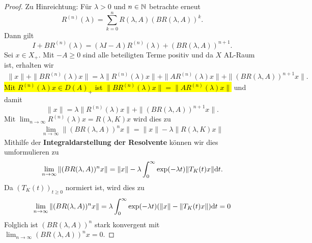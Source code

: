 \begin{proof}

\par 
Zu Hinreichtung: Für $\lambda >0$ und $n\in \mathbb{N}$ betrachte erneut
\begin{equation*}
R^{(n)}(\lambda) = \sum_{k=0}^n R(\lambda, A)(BR(\lambda, A))^k.
\end{equation*}
Dann gilt 
\begin{equation*}\label{eq2}
 I +BR^{(n)}(\lambda)=(\lambda I -A)R^{(n)}(\lambda) + (BR(\lambda, A))^{n+1}.
\end{equation*} 
Sei $x\in X_+$. Mit $-A\geq0$ sind alle beteiligten Terme positiv und da $X$ AL-Raum ist, erhalten wir
\begin{align*}
\|x\| + \|BR^{(n)}(\lambda)x\|= \lambda\| R^{(n)}(\lambda) x\| + \|AR^{(n)} (\lambda) x\|+\|(BR(\lambda, A))^{n+1}x\|.
\end{align*}
\hl{Mit $R^{(n)}(\lambda)x\in D(A)_+$ ist $\|BR^{(n)}(\lambda)x\|=\|AR^{(n)}(\lambda) x\|$} und damit
\begin{equation*}
\|x\|=\lambda \|R^{(n)}(\lambda)x\| + \|(BR(\lambda, A))^{n+1}x\|.
\end{equation*}
Mit $\lim_{n\to\infty}R^{(n)}(\lambda)x= R(\lambda, K)x$ wird dies zu
\begin{align*}
\lim_{n\to\infty}\|(BR(\lambda, A))^n x\|=\|x\|- \lambda\|R(\lambda, K)x\|
\end{align*}
Mithilfe der  \index{}\textbf{Integraldarstellung der Resolvente} können wir dies umformulieren zu
\begin{align*}
\lim_{n\to\infty}\|(BR(\lambda, A))^n x\| = \|x\|- \lambda\int_0^\infty \exp(-\lambda t)\|T_K(t)x\|\textnormal dt.
\end{align*}
Da $(T_K(t))_{t\geq0}$ normiert ist, wird dies zu
\begin{equation*}
\lim_{n\to\infty}\|(BR(\lambda, A))^n x\| =\lambda \int_0^\infty \exp(-\lambda t)(\|x\|-\|T_K(t)x\|)\textnormal dt=0
\end{equation*}
Folglich ist  $(BR(\lambda, A))^n$ stark konvergent mit $\lim_{n\to\infty}(BR(\lambda, A))^{n}x=0$.


\end{proof}
